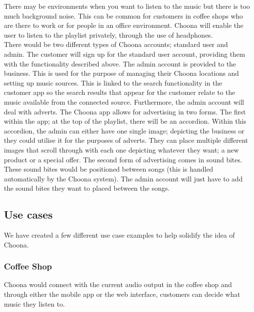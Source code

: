 There may be environments when you want to listen to the music but there is too much background noise.  This can be common for customers in coffee shops who are there to work or for people in an office environment.  Choona will enable the user to listen to the playlist privately, through the use of headphones.  \\

There would be two different types of Choona accounts; standard user and admin.  The customer will sign up for the standard user account, providing them with the functionality described above.  The admin account is provided to the business.  This is used for the purpose of managing their Choona locations and setting up music sources. This is linked to the search functionality in the customer app so the search results that appear for the customer relate to the music available from the connected source.  Furthermore, the admin account will deal with adverts.  The Choona app allows for advertising in two forms.  The first within the app; at the top of the playlist, there will be an accordion.  Within this accordion, the admin can either have one single image; depicting the business or they could utilise it for the purposes of adverts.  They can place multiple different images that scroll through with each one depicting whatever they want; a new product or a special offer.  The second form of advertising comes in sound bites.  These sound bites would be positioned between songs (this is handled automatically by the Choona system).  The admin account will just have to add the sound bites they want to placed between the songs.  

\subsection{Use cases}
We have created a few different use case examples to help solidify the idea of Choona.
\subsubsection{Coffee Shop} 
Choona would connect with the current audio output in the coffee shop and through either the mobile app or the web interface, customers can decide what music they listen to.  \\

